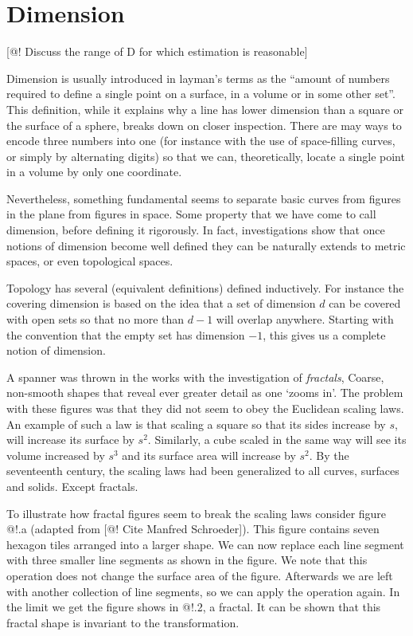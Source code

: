 \documentclass[11pt]{article}
\begin{document}
\section{Dimension}

[@! Discuss the range of D for which estimation is reasonable]

Dimension is usually introduced in layman's terms as the ``amount of numbers required to define a single point on a surface, in a volume or in some other set''. This definition, while it explains why a line has lower dimension than a square or the surface of a sphere, breaks down on closer inspection. There are may ways to encode three numbers into one (for instance with the use of space-filling curves, or simply by alternating digits) so that we can, theoretically, locate a single point in a volume by only one coordinate. 

Nevertheless, something fundamental seems to separate basic curves from figures in the plane from figures in space. Some property that we have come to call dimension, before defining it rigorously. In fact, investigations show that once notions of dimension become well defined they can be naturally extends to metric spaces, or even topological spaces. 

Topology has several (equivalent definitions) defined inductively. For instance the covering dimension is based on the idea that a set of dimension $d$ can be covered with open sets so that no more than $d-1$ will overlap anywhere. Starting with the convention that the empty set has dimension $-1$, this gives us a complete notion of dimension.

A spanner was thrown in the works with the investigation of \textit{fractals}, Coarse, non-smooth shapes that reveal ever greater detail as one `zooms in'. The problem with these figures was that they did not seem to obey the Euclidean scaling laws. An example of such a law is that scaling a square so that its sides increase by $s$, will increase its surface by $s^2$. Similarly, a cube scaled in the same way will see its volume increased by $s^3$ and its surface area will increase by $s^2$. By the seventeenth century, the scaling laws had been generalized to all curves, surfaces and solids. Except fractals.

To illustrate how fractal figures seem to break the scaling laws consider figure @!.a (adapted from [@! Cite Manfred Schroeder]). This figure contains seven hexagon tiles arranged into a larger shape. We can now replace each line segment with three smaller line segments as shown in the figure. We note that this operation does not change the surface area of the figure. Afterwards we are left with another collection of line segments, so we can apply the operation again. In the limit we get the figure shows in @!.2, a fractal. It can be shown that this fractal shape is invariant to the transformation.
\end{document}
